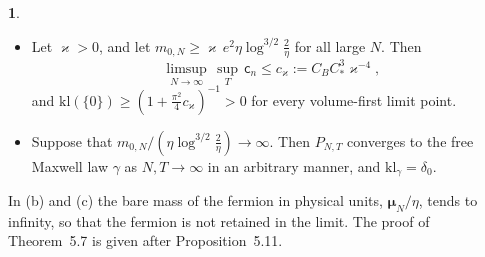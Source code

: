 \documentclass[11pt]{amsart}
\newcommand{\namedhead}{}
\theoremstyle{definition}
\newtheorem*{namedinner}{\namedhead}
\newenvironment{named}[1]{\renewcommand{\namedhead}{#1}\begin{namedinner}}{\end{namedinner}}
\begin{document}
\begin{named}{Theorem 5.7}
\begin{itemize}
Consequently $\mathsf k_2\le C_\kappa\,\allowbreak \frac{q^2}{\bar m\eta}\,\allowbreak (\bar m\eta)^{-\kappa}$ for every $\kappa>0$; the bound (i) corresponds to $\kappa=3$ and the bound (ii) to $\kappa=\frac32$.
The bound on $\mathsf k_2$ holds for all $T$ and the values of $N$ just specified, with
\begin{equation*}
C_\kappa:=C_B\max\Bigl\{\bigl(\tfrac52L\bigr)^3,\ C_*^3\Bigl(\frac{e^2}{\bar m}\Bigr)^3\,2^\kappa\Bigl(\frac{6}{\kappa\exp 1}\Bigr)^6\Bigr\},
\end{equation*}
a constant that depends only on $(\kappa,\rho,L,e^2/\bar m)$.
Let $\mathsf x_0=\mathsf x_0(\rho,L,e^2/\bar m)\in(0,1]$ be the largest number such that
\begin{equation*}
\max\Bigl\{\tfrac52L\mathsf x,\ C_*\frac{e^2}{\bar m}\,\mathsf x\log^2\frac{2}{\mathsf x}\Bigr\}\le1\qquad\text{for all }\mathsf x\in(0,\mathsf x_0].
\end{equation*}
The other values of $N$ are finitely many and satisfy $\bar m\eta>\mathsf x_0$; for them (i) gives
\begin{equation*}
\mathsf c_n\le576\,\pi^2\mathsf h_3^4\,\mathsf x_0^{-3}\,\frac{q^2}{\bar m\eta}.
\end{equation*}
Hence the bound on $\mathsf k_2$ holds for all $N$ and $T$ once $576\,\pi^2\mathsf h_3^4\,\mathsf x_0^{-3}$ is added to $C_\kappa$.
\item[(b)] Let $\varkappa>0$, and let $m_{0,N}\ge\varkappa\,e^2\eta\log^{3/2}\frac2\eta$ for all large $N$.
Then
\begin{equation*}
\limsup_{N\to\infty}\,\sup_T\,\mathsf c_n\le c_\varkappa:=C_BC_*^3\varkappa^{-4},
\end{equation*}
and $\mathrm{kl}(\{0\})\ge(1+\frac{\pi^2}{4}c_\varkappa)^{-1}>0$ for every volume-first limit point.
\item[(c)] Suppose that $m_{0,N}/(\eta\log^{3/2}\frac2\eta)\to\infty$.
Then $P_{N,T}$ converges to the free Maxwell law $\gamma$ as $N,T\to\infty$ in an arbitrary manner, and $\mathrm{kl}_\gamma=\delta_0$.
\end{itemize}
\end{named}

In (b) and (c) the bare mass of the fermion in physical units, $\boldsymbol\mu_N/\eta$, tends to infinity, so that the fermion is not retained in the limit.
The proof of Theorem~5.7 is given after Proposition~5.11.
\end{document}
